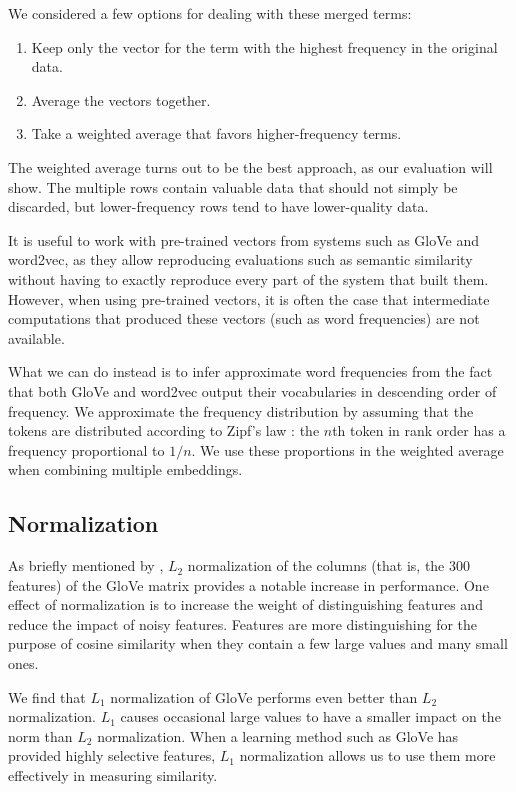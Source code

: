 \documentclass[11pt,letterpaper]{article}
\begin{document}
We considered a few options for dealing with these merged terms:

\begin{enumerate}
\item Keep only the vector for the term with the highest frequency in the
    original data.
\item Average the vectors together.
\item Take a weighted average that favors higher-frequency terms.
\end{enumerate}

The weighted average turns out to be the best approach, as our evaluation will
show. The multiple rows contain valuable data that should not simply be
discarded, but lower-frequency rows tend to have lower-quality data.

It is useful to work with pre-trained vectors from systems such as GloVe and
word2vec, as they allow reproducing evaluations such as semantic similarity
without having to exactly reproduce every part of the system that built them.
However, when using pre-trained vectors, it is often the case that intermediate
computations that produced these vectors (such as word frequencies) are not
available.

What we can do instead is to infer approximate word frequencies from the fact
that both GloVe and word2vec output their vocabularies in descending order of
frequency. We approximate the frequency distribution by assuming that the tokens
are distributed according to Zipf's law \cite{zipf1949human}: the $n$th token in
rank order has a frequency proportional to $1/n$. We use these proportions in
the weighted average when combining multiple embeddings.


\subsection{Normalization}

As briefly mentioned by , $L_2$ normalization of
the columns (that is, the 300 features) of the GloVe matrix provides a notable
increase in performance. One effect of normalization is to increase the weight
of distinguishing features and reduce the impact of noisy features.  Features
are more distinguishing for the purpose of cosine similarity when they contain
a few large values and many small ones.

We find that $L_1$ normalization of GloVe performs even better than $L_2$
normalization. $L_1$ causes occasional large values to have a smaller impact on the norm
than $L_2$ normalization. When a learning method such as GloVe has provided
highly selective features, $L_1$ normalization allows us to use them more effectively
in measuring similarity.
\end{document}

